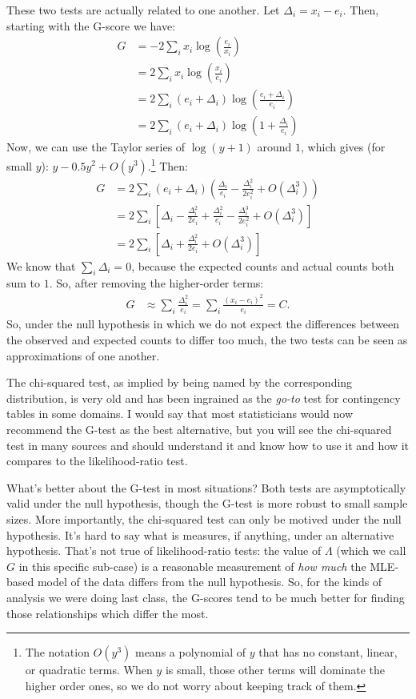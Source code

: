 \documentclass{tufte-handout}
\begin{document}
These two tests are actually related to one another. Let $\Delta_i = x_i - e_i$.
Then, starting with the G-score we have:
\begin{align*}
G &= -2 \sum_i x_i \log\left( \frac{e_i}{x_i} \right) \\
&= 2 \sum_i x_i \log\left( \frac{x_i}{e_i} \right) \\
&= 2 \sum_i (e_i + \Delta_i) \log\left( \frac{e_i + \Delta_i}{e_i} \right) \\
&= 2 \sum_i (e_i + \Delta_i) \log\left( 1 + \frac{\Delta_i}{e_i} \right)
\end{align*}
Now, we can use the Taylor series of $\log(y + 1)$ around $1$, which
gives (for small $y$): $y - 0.5 y^2 + O(y^3)$.\footnote{
  The notation $O(y^3)$ means a polynomial of $y$
  that has no constant, linear, or quadratic terms. When $y$ is
  small, those other terms will dominate the higher order ones,
  so we do not worry about keeping track of them.
} Then:
\begin{align*}
G
&= 2 \sum_i (e_i + \Delta_i) \left( \frac{\Delta_i}{e_i} - \frac{\Delta_i^2}{2e_i^2} + O(\Delta_i^3)\right) \\
&= 2 \sum_i \left[\Delta_i - \frac{\Delta_i^2}{2e_i} +
                  \frac{\Delta^2_i}{e_i} - \frac{\Delta_i^3}{2e_i^2} + O(\Delta_i^3) \right]\\
&= 2 \sum_i \left[\Delta_i + \frac{\Delta^2_i}{2e_i} + O(\Delta_i^3) \right]
\end{align*}
We know that $\sum_i \Delta_i = 0$, because the expected counts and actual counts
both sum to $1$. So, after removing the higher-order terms:
\begin{align*}
G &\approx \sum_i \frac{\Delta^2_i}{e_i} = \sum_i \frac{(x_i - e_i)^2}{e_i} = C.
\end{align*}
So, under the null hypothesis in which we do not expect the differences between
the observed and expected counts to differ too much, the two tests can be seen
as approximations of one another.

The chi-squared test, as implied by being named by the corresponding distribution,
is very old and has been ingrained as the \textit{go-to} test for contingency
tables in some domains. I would say that most statisticians would now recommend
the G-test as the best alternative, but you will see the chi-squared test in many
sources and should understand it and know how to use it and how it compares to the
likelihood-ratio test. 

What's better about the G-test in most situations? Both tests are asymptotically
valid under the null hypothesis, though the G-test is more robust to small sample
sizes. More importantly, the chi-squared test can only be motived under the null
hypothesis. It's hard to say what is measures, if anything, under an alternative
hypothesis. That's not true of likelihood-ratio tests: the value of $\Lambda$
(which we call $G$ in this specific sub-case) is a reasonable measurement of 
\textit{how much} the MLE-based model of the data differs from the null hypothesis.
So, for the kinds of analysis we were doing last class, the G-scores tend to be
much better for finding those relationships which differ the most. 
\end{document}
